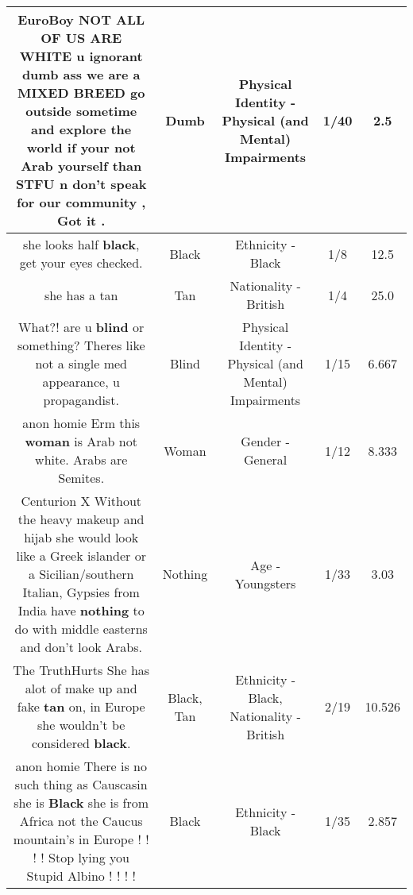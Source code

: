 \documentclass[11pt]{article}
\newlength\mylength
\begin{document}
\begin{center}
\begin{longtable}{|C{.65\mylength}|C{.30\mylength}|C{.12\mylength}|C{.12\mylength}|C{.12\mylength}|}
  \small EuroBoy NOT ALL OF US ARE WHITE u ignorant \textbf{dumb} ass we are a MIXED BREED go outside sometime and explore the world if your not Arab yourself than STFU n don't speak for our community ,  Got it .\normalsize   & Dumb & Physical Identity - Physical (and Mental) Impairments & 1/40 & 2.5 \\  \hline
  \small she looks half \textbf{black}, get your eyes checked.\normalsize   & Black & Ethnicity - Black & 1/8 & 12.5 \\  \hline
  \small she has a tan\normalsize   & Tan & Nationality - British & 1/4 & 25.0 \\  \hline
  \small What?! are u \textbf{blind} or something? Theres like not a single med appearance, u propagandist.\normalsize   & Blind & Physical Identity - Physical (and Mental) Impairments & 1/15 & 6.667 \\  \hline
  \small anon homie Erm this \textbf{woman} is Arab not white. Arabs are Semites.\normalsize   & Woman & Gender - General & 1/12 & 8.333 \\  \hline
  \small Centurion X Without the heavy makeup and hijab she would look like a Greek islander or a Sicilian/southern Italian, Gypsies from India have \textbf{nothing} to do with middle easterns and don't look Arabs.\normalsize   & Nothing & Age - Youngsters & 1/33 & 3.03 \\  \hline
  \small The TruthHurts She has alot of make up and fake \textbf{tan} on, in Europe she wouldn't be considered \textbf{black}.\normalsize   & Black, Tan & Ethnicity - Black, Nationality - British & 2/19 & 10.526 \\  \hline
  \small anon homie There is no such thing as Causcasin she is \textbf{Black} she is from Africa not the Caucus mountain's in Europe ! ! ! ! Stop lying you Stupid Albino ! ! ! !\normalsize   & Black & Ethnicity - Black & 1/35 & 2.857 \\  \hline

\end{longtable}
\end{center}
\end{document}
